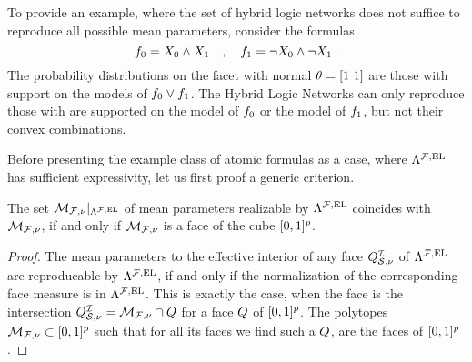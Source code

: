 \begin{example}
    \label{exa:insufficentHLNsetExpressivity}
    To provide an example, where the set of hybrid logic networks does not suffice to reproduce all possible mean parameters, consider the formulas
    \[ f_{0} = X_{0} \land X_{1} \quad, \quad f_{1} = \lnot X_{0} \land \lnot X_{1} \, . \]
    The probability distributions on the facet with normal $\theta=[1\,\, 1]$ are those with support on the models of $f_{0}\lor f_{1}$.
    The Hybrid Logic Networks can only reproduce those with are supported on the model of $f_{0}$ or the model of $f_{1}$, but not their convex combinations.

\end{example}

Before presenting the example class of atomic formulas as a case, where $\Lambda^{\mathcal{F},\mathrm{EL}}$ has sufficient expressivity, let us first proof a generic criterion.


\begin{theorem}
    \label{the:sufficientHLNExpressivity}
    The set $\mathcal{M}_{\mathcal{F},\nu}|_{\Lambda^{\mathcal{F},\mathrm{EL}}}$ of mean parameters realizable by $\Lambda^{\mathcal{F},\mathrm{EL}}$ coincides with $\mathcal{M}_{\mathcal{F},\nu}$, if and only if $\mathcal{M}_{\mathcal{F},\nu}$ is a face of the cube $[0,1]^{p}$.
\end{theorem}
\begin{proof}
    The mean parameters to the effective interior of any face $Q^{\mathcal{I}}_{\mathcal{S},\nu}$ of $\Lambda^{\mathcal{F},\mathrm{EL}}$ are reproducable by $\Lambda^{\mathcal{F},\mathrm{EL}}$, if and only if the normalization of the corresponding face measure is in $\Lambda^{\mathcal{F},\mathrm{EL}}$.
    This is exactly the case, when the face is the intersection $Q^{\mathcal{I}}_{\mathcal{S},\nu}=\mathcal{M}_{\mathcal{F},\nu}\cap Q$ for a face $Q$ of $[0,1]^{p}$.
    The polytopes $\mathcal{M}_{\mathcal{F},\nu}\subset[0,1]^{p}$ such that for all its faces we find such a $Q$, are the faces of $[0,1]^{p}$.
\end{proof}

